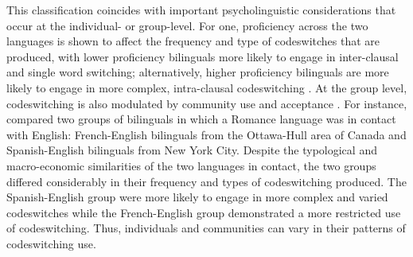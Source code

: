 \documentclass[output=paper,colorlinks,citecolor=brown]{langscibook}
\begin{document}
This classification coincides with important psycholinguistic considerations that occur at the individual- or group-level. For one, proficiency across the two languages is shown to affect the frequency and type of codeswitches that are produced, with lower proficiency bilinguals more likely to engage in inter-clausal and single word switching; alternatively, higher proficiency bilinguals are more likely to engage in more complex, intra-clausal codeswitching \citep{Miccioetal2009,Poplack1980}. At the group level, codeswitching is also modulated by community use and acceptance \citep{ParafitaCoutoetal2023}. For instance, \citet{Poplack1987} compared two groups of bilinguals in which a Romance language was in contact with English: French-English bilinguals from the Ottawa-Hull area of Canada and Spanish-English bilinguals from New York City. Despite the typological and macro-economic similarities of the two languages in contact, the two groups differed considerably in their frequency and types of codeswitching produced. The Spanish-English group were more likely to engage in more complex and varied codeswitches while the French-English group demonstrated a more restricted use of codeswitching. Thus, individuals and communities can vary in their patterns of codeswitching use.
\end{document}
